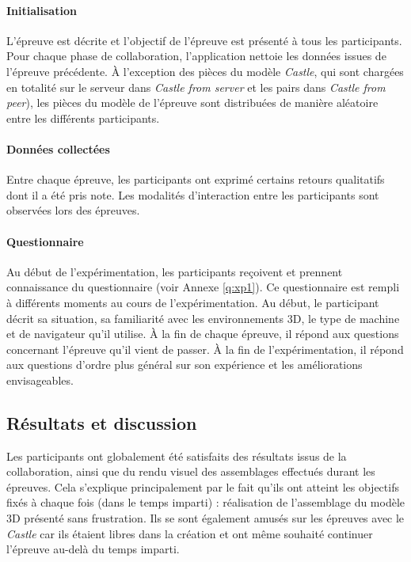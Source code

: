 \paragraph{Initialisation}

L'épreuve est décrite et l'objectif de l'épreuve est présenté à tous les participants.
Pour chaque phase de collaboration, l'application nettoie les données issues de 
l'épreuve précédente. 
À l'exception des pièces du modèle \textit{Castle}, qui sont chargées
en totalité sur le serveur dans \textit{Castle from server} et les pairs dans 
\textit{Castle from peer}), les pièces du modèle de l'épreuve 
sont distribuées de manière aléatoire entre les différents participants.

\paragraph{Données collectées}
Entre chaque épreuve, les 
participants ont exprimé certains retours qualitatifs dont il a été pris note. Les modalités d'interaction entre les participants sont observées lors des épreuves.

\paragraph{Questionnaire}
Au début de l'expérimentation, les participants reçoivent et prennent 
con\-naissance 
du questionnaire (voir Annexe \ref{q:xp1}). Ce questionnaire est rempli à différents 
moments au cours de l'expérimentation. Au début, le participant décrit sa situation, 
sa familiarité avec les environnements \gls{3D}, le type de machine et de 
navigateur qu'il utilise. À la fin de chaque épreuve, il répond aux questions concernant 
l'épreuve qu'il vient de passer. À la fin de l'expérimentation, il répond aux 
questions d'ordre plus général sur son expérience et les améliorations 
envisageables.
\subsection{Résultats et discussion}
Les participants ont globalement été satisfaits des résultats issus de la 
collaboration, ainsi que du rendu visuel des assemblages effectués durant les 
épreuves. Cela s'explique principalement par le fait qu'ils ont atteint les 
objectifs fixés à chaque fois (dans le temps imparti) : réalisation de l'assemblage du modèle \gls{3D} 
présenté sans frustration. Ils se sont également \og amusés\fg{} sur les épreuves
avec le \textit{Castle} car ils étaient libres dans la création et ont même souhaité 
continuer l'épreuve au-delà du temps imparti. 

